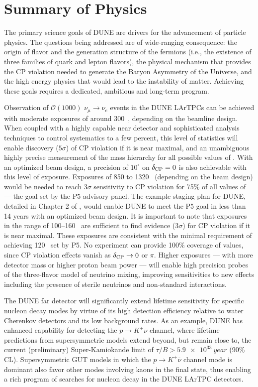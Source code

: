 
\chapter{Summary of Physics}
\label{ch:physics-summary}

The primary science goals of DUNE are drivers for the advancement of
particle physics. The questions being addressed are of wide-ranging
consequence: the origin of flavor and the generation structure of the
fermions (i.e., the existence of three families of quark and lepton
flavors), the physical mechanism that provides the CP violation needed
to generate the Baryon Asymmetry of the Universe, and the high energy
physics that would lead to the instability of matter.  Achieving these
goals requires a dedicated, ambitious and long-term program. 

Observation of $\mathcal{O}(1000)$ $\nu_\mu \rightarrow \nu_e$ events
in the DUNE LArTPCs can be achieved with moderate exposures of around
300~\ktMWyr, depending on the beamline design. When coupled with a
highly capable near detector and sophisticated analysis techniques to
control systematics to a few percent, this level of statistics will enable
discovery ($5\sigma$) of CP violation if it is near maximal, and an
unambiguous highly precise measurement of the mass hierarchy for all
possible values of \deltacp. With an optimized beam design, a
precision of $10^\circ$ on $\delta_{\rm CP} = 0$ is also achievable
with this level of exposure.  Exposures of 850 to 1320~\ktMWyr{} 
(depending on the beam design) would be needed to reach $3\sigma$
sensitivity to CP violation for 75\% of all values of \deltacp{} --- the
goal set by the P5 advisory panel. The example staging plan for DUNE,
detailed in Chapter 2 of \volintro, would enable DUNE to meet the P5
goal in less than 14 years with an optimized beam design. It is
important to note that exposures in the range of 100--160~\ktMWyr{} are
sufficient to find evidence ($3 \sigma$) for CP violation if it is
near maximal. These exposures are consistent with the minimal
requirement of achieving 120~\ktMWyr{} set by P5. No experiment can
provide 100\% coverage of \deltacp values, since CP violation
effects vanish as $\mdeltacp\to 0$ or $\pi$. Higher exposures --- with
more detector mass or higher proton beam power --- will enable high
precision probes of the three-flavor model of neutrino mixing, improving
sensitivities to new effects including the presence of sterile
neutrinos and non-standard interactions.

The DUNE far detector will significantly extend lifetime sensitivity
for specific nucleon decay modes by virtue of its high detection
efficiency relative to water Cherenkov detectors and its low
background rates.  As an example, DUNE has enhanced capability for
detecting the $p\to K^+\overline{\nu}$ channel, where lifetime
predictions from supersymmetric models extend beyond, but remain close
to, the current (preliminary) Super-Kamiokande limit of $\tau/B >
\SI{5.9e33}{year}$ (90\% CL). Supersymmetric GUT models in which
the $p\to K^+\overline{\nu}$ channel mode is dominant also favor
other modes involving kaons in the final state, thus enabling a rich 
program of searches for nucleon decay in the DUNE LArTPC detectors.


